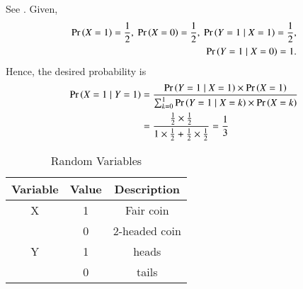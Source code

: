 See 
    .
Given,
\begin{align}
\Pr\left(X=1\right)=\frac{1}{2},\
\Pr\left(X=0\right)=\frac{1}{2},\
\Pr\left(Y=1 \mid X=1\right)=\frac{1}{2},\\
\Pr\left(Y=1 \mid X=0\right)=1.
\end{align}
Hence, the desired probability is
\begin{align}
\Pr\left(X=1 \mid Y=1\right)&=\frac{\Pr\left(Y=1 \mid X=1\right)\times\Pr\left(X=1\right)}{\sum_{k=0}^{1}\Pr\left(Y=1 \mid X=k\right)\times\Pr\left(X=k\right) }\\
&=\frac{\frac{1}{2}\times \frac{1}{2}}{1\times \frac{1}{2}+\frac{1}{2}\times \frac{1}{2}} 
=\frac{1}{3}
\end{align}

\begin{table}[H]
    \centering
    \caption{Random Variables}
    \label{tab:exemplar/12/13/3/32}
    \begin{tabular}{|c|c|c|}
        \hline
        Variable & Value & Description          \\
        \hline
        X        & 1     & Fair coin            \\
        \cline{2-3}
                 & 0     & 2-headed coin        \\
        \hline
        Y        & 1     & heads   \\
        \cline{2-3}
                 & 0     & tails   \\
        \hline
    \end{tabular}
\end{table}
